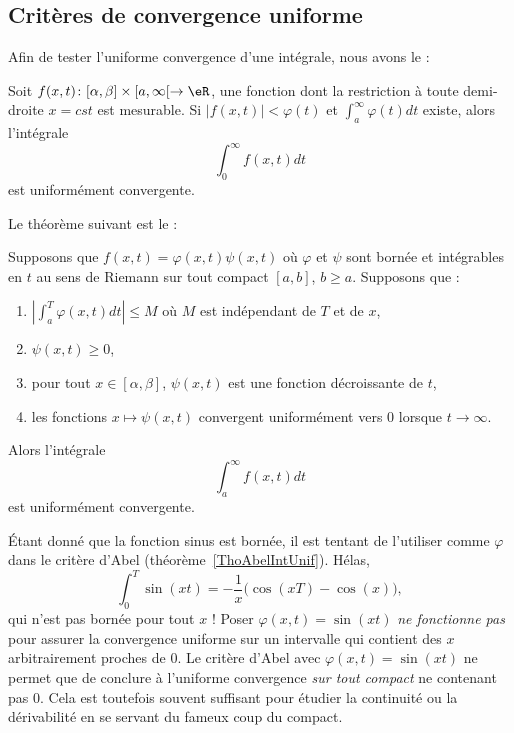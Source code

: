 \subsection{Critères de convergence uniforme}

Afin de tester l'uniforme convergence d'une intégrale, nous avons le :
\begin{theorem}		\label{ThoCritWeiIntUnifCv}
Soit $f(x,t)\colon [\alpha,\beta]\times[a,\infty[ \to \eR$, une fonction dont la restriction à toute demi-droite $x=cst$ est mesurable. Si $| f(x,t) |< \varphi(t)$ et $\int_a^{\infty}\varphi(t)dt$ existe, alors l'intégrale
\begin{equation}
	\int_0^{\infty}f(x,t)dt
\end{equation}
est uniformément convergente.
\end{theorem}

Le théorème suivant est le  :
\begin{theorem}		\label{ThoAbelIntUnif}
	Supposons que $f(x,t)=\varphi(x,t)\psi(x,t)$ où $\varphi$ et $\psi$ sont bornée et intégrables en $t$ au sens de Riemann sur tout compact $[a,b]$, $b\geq a$. Supposons que :
	\begin{enumerate}
		\item $| \int_a^{T}\varphi(x,t)dt |\leq M$ où $M$ est indépendant de $T$ et de $x$,
		\item $\psi(x,t)\geq 0$,
		\item pour tout $x\in[\alpha,\beta]$, $\psi(x,t)$ est une fonction décroissante de $t$,
		\item les fonctions $x\mapsto \psi(x,t)$ convergent uniformément vers $0$ lorsque $t\to\infty$.
	\end{enumerate}
	Alors l'intégrale
	\begin{equation}
		\int_a^{\infty}f(x,t)dt
	\end{equation}
	est uniformément convergente.
\end{theorem}

\begin{remark}
    Étant donné que la fonction sinus est bornée, il est tentant de l'utiliser comme $\varphi$ dans le critère d'Abel (théorème~\ref{ThoAbelIntUnif}). Hélas,
    \begin{equation}
        \int_0^T\sin(xt)=-\frac{ 1 }{ x }\big( \cos(xT)-\cos(x) \big),
    \end{equation}
    qui n'est pas bornée pour tout $x$ ! Poser $\varphi(x,t)=\sin(xt)$ \emph{ne fonctionne pas} pour assurer la convergence uniforme sur un intervalle qui contient des $x$ arbitrairement proches de $0$. Le critère d'Abel avec $\varphi(x,t)=\sin(xt)$ ne permet que de conclure à l'uniforme convergence \emph{sur tout compact} ne contenant pas $0$. Cela est toutefois souvent suffisant pour étudier la continuité ou la dérivabilité en se servant du fameux coup du compact.
\end{remark}


